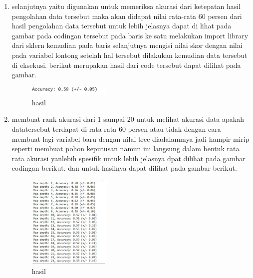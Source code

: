 \begin{enumerate}
\item selanjutnya yaitu digunakan untuk memeriksa akurasi dari ketepatan hasil pengolahan data tersebut maka akan didapat nilai rata-rata 60 persen dari hasil pengolahan data tersebut untuk lebih jelasnya dapat di lihat pada gambar pada codingan tersebut pada baris ke satu melakukan import library dari sklern kemudian pada baris selanjutnya mengisi nilai skor dengan nilai pada variabel lontong setelah hal tersebut dilakukan kemudian data tersebut di eksekusi. berikut merupakan hasil dari code tersebut dapat dilihat pada gambar.

\begin{figure}[H]
\centering
\includegraphics[width= 4cm]{figures/1174039/chapter2/16.JPG}
\caption{hasil}

\end{figure}


\item membuat rank akurasi dari 1 sampai 20 untuk melihat akurasi data apakah datatersebut terdapat di rata rata 60 persen atau tidak dengan cara membuat lagi variabel baru dengan nilai tree diadalammya jadi hampir mirip seperti membuat pohon keputusan namun ini langsung dalam bentuk rata rata akurasi yanlebih spesifik untuk lebih jelasnya dpat dilihat pada gambar codingan berikut. dan untuk hasilnya dapat dilihat pada gambar berikut.

\begin{figure}[H]
\centering
\includegraphics[width= 4cm]{figures/1174039/chapter2/19.JPG}
\caption{hasil}

\end{figure}


\end{enumerate}
